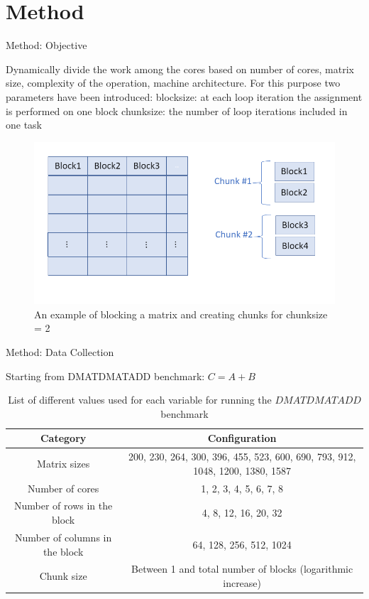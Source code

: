 \documentclass[10pt]{beamer}
\begin{document}
\section{Method}
\begin{frame}{Method: Objective}
	\begin{outline}
		Dynamically divide the work among the cores based on number of cores, matrix size, complexity of the operation, machine architecture.
		For this purpose two parameters have been introduced:
		\1block\textunderscore size: at each loop iteration the assignment is performed on one block
		\1chunk\textunderscore size: the number of loop iterations included in one task 
		\begin{figure}
			\centering
			\includegraphics[width=0.72\linewidth]{images/chunks.png}
			\caption{An example of blocking a matrix and creating chunks for chunk\textunderscore size = 2}	
		\end{figure}	
	\end{outline}
\end{frame}

\begin{frame}{Method: Data Collection}
	\begin{outline}
		\1Starting from DMATDMATADD benchmark: $C=A+B$
	\begin{table}[H]
		\centering
		\resizebox{0.8\textwidth}{!}
		{\begin{tabular}{|c | c |} 
				\hline
				Category & Configuration \\
				\hline
				\hline
				Matrix sizes & 200, 230, 264, 300, 396, 455, 523, 600, 690, 793, 912, 1048, 1200, 1380, 1587 \\ [0.5ex] 
				\hline
				Number of cores & 1, 2, 3, 4, 5, 6, 7, 8 \\ 	
				\hline
				Number of rows in the block & 4, 8, 12, 16, 20, 32 \\
				\hline	
				Number of columns in the block & 64, 128, 256, 512, 1024 \\
				\hline
				Chunk size & Between 1 and total number of blocks (logarithmic increase)\\\hline
		\end{tabular}}
		
		\caption{List of different values used for each variable for running the $DMATDMATADD$ benchmark}
		\label{table1}
	\end{table}
	\end{outline}
\end{frame}
\end{document}
